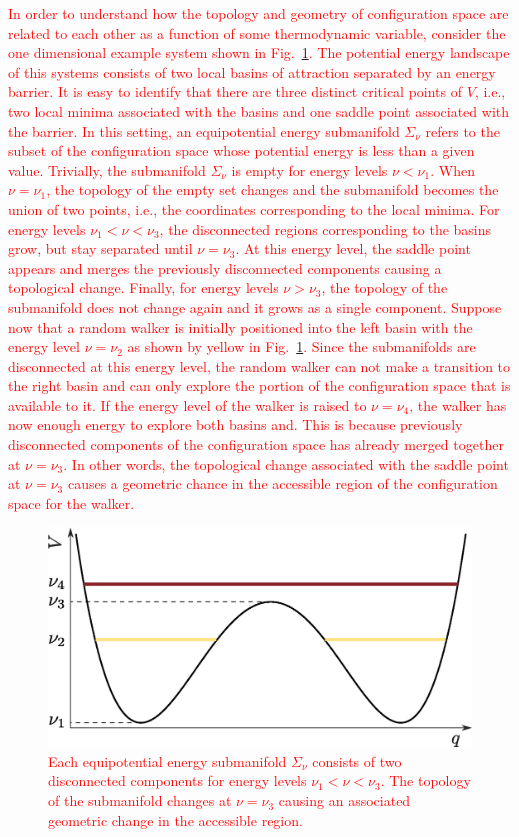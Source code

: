 \documentclass[default,iicol]{sn-jnl}%
\theoremstyle{thmstyleone}%
\theoremstyle{thmstyletwo}%
\theoremstyle{thmstylethree}%
\providecommand{\ie}{i.e., }
\providecommand{\red}[1]{\textcolor{red}{#1}}
\begin{document}
\red{
In order to understand how the topology and geometry of configuration space are related to each other as a function of some thermodynamic variable, consider the one dimensional example system shown in Fig.\ \ref{fig:double_well}. The potential energy landscape of this systems consists of two local basins of attraction separated by an energy barrier. It is easy to identify that there are three distinct critical points of $V$, \ie two local minima associated with the basins and one saddle point associated with the barrier. In this setting, an equipotential energy submanifold $\Sigma_{\nu}$ refers to the subset of the configuration space whose potential energy is less than a given value. Trivially, the submanifold $\Sigma_{\nu}$ is empty for energy levels $\nu < \nu_{1}$. When $\nu=\nu_{1}$, the topology of the empty set changes and the submanifold becomes the union of two points, \ie the coordinates corresponding to the local minima. For energy levels $\nu_{1} < \nu < \nu_{3}$, the disconnected regions corresponding to the basins grow, but stay separated until $\nu=\nu_{3}$. At this energy level, the saddle point appears and merges the previously disconnected components causing a topological change. Finally, for energy levels $\nu>\nu_{3}$, the topology of the submanifold does not change again and it grows as a single component. Suppose now that a random walker is initially positioned into the left basin with the energy level $\nu=\nu_{2}$ as shown by yellow in Fig.\ \ref{fig:double_well}. Since the submanifolds are disconnected at this energy level, the random walker can not make a transition to the right basin and can only explore the portion of the configuration space that is available to it. If the energy level of the walker is raised to $\nu=\nu_{4}$, the walker has now enough energy to explore both basins and. This is because previously disconnected components of the configuration space has already merged together at $\nu=\nu_{3}$. In other words, the topological change associated with the saddle point at $\nu=\nu_{3}$ causes a geometric chance in the accessible region of the configuration space for the walker.
}
\begin{figure}[h]%
	\centering
	\includegraphics[width=0.9\columnwidth]{double_well.eps}
	\caption{\red{Each equipotential energy submanifold $\Sigma_{\nu}$ consists of two disconnected components for energy levels $\nu_{1}<\nu<\nu_{3}$. The topology of the submanifold changes at $\nu=\nu_{3}$ causing an associated geometric change in the accessible region.}}
	\label{fig:double_well}
\end{figure}
\end{document}
